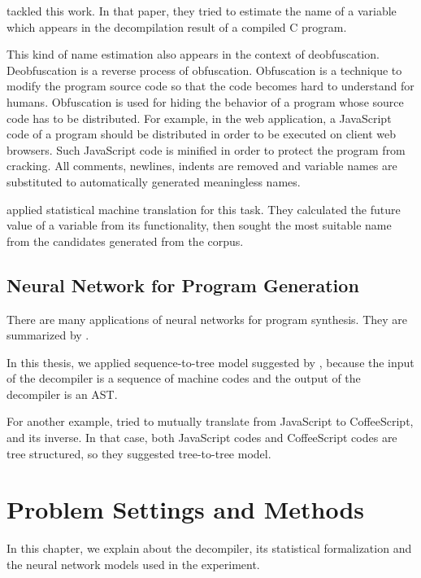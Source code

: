 \documentclass[senior,final,11pt]{iscs-thesis}
\begin{document}
\citet{name_recover_from_decompile_result} tackled this work. 
In that paper, they tried to estimate the name of a variable which appears in the decompilation result of a compiled C program.

This kind of name estimation also appears in the context of deobfuscation.
\citep{deobfsucation_matome}
Deobfuscation is a reverse process of obfuscation.
Obfuscation is a technique to modify the program source code so that the code becomes hard to understand for humans. 
Obfuscation is used for hiding the behavior of a program whose source code has to be distributed.
For example, in the web application, a JavaScript code of a program should be distributed in order to be executed on client web browsers.
Such JavaScript code is minified in order to protect the program from cracking. 
All comments, newlines, indents are removed and variable names are substituted to automatically generated meaningless names. 

\citet{JSNaughty} applied statistical machine translation for this task. 
They calculated the future value of a variable from its functionality, then 
sought the most suitable name from the candidates generated from the corpus.


\section{Neural Network for Program Generation}

There are many applications of neural networks for program synthesis. They are summarized by \citet{deep_programming_matome}.

In this thesis, we applied sequence-to-tree model suggested by \citet{Seq2Tree}, 
because the input of the decompiler is a sequence of machine codes and
the output of the decompiler is an AST.

For another example, \citet{coffeescript_to_javascript} tried to mutually translate from JavaScript to CoffeeScript, and its inverse.
In that case, both JavaScript codes and CoffeeScript codes are tree structured, so they suggested tree-to-tree model.


\chapter{Problem Settings and Methods}

In this chapter, we explain about the decompiler, its statistical formalization and 
the neural network models used in the experiment.
\end{document}
